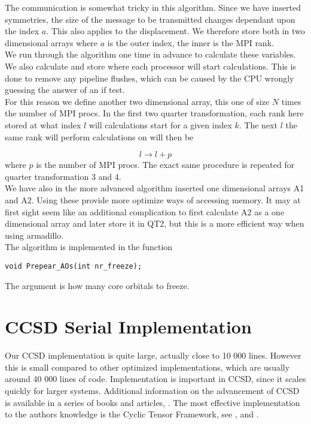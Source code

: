 \documentclass[a4paper,norsk,11pt,twoside]{report}
\begin{document}
The communication is somewhat tricky in this algorithm. Since we have
inserted symmetries, the size of the message to be transmitted changes
dependant upon the index $a$. This also applies to the
displacement. We therefore store both in two dimensional arrays where
$a$ is the outer index, the inner is the MPI rank. \\

We run through the algorithm one time in advance to calculate these
variables. We also calculate and store where each processor will start
calculations. This is done to remove any pipeline flushes, which can
be caused by the CPU wrongly guessing the answer of an if test. \\

For this reason we define another two dimensional array, this one of
size $N$ times the number of MPI procs. In the first two quarter
transformation, each rank here stored at what index $l$ will
calculations start for a given index $k$. The next $l$ the same rank
will perform calculations on will then be

\begin{equation}
l \rightarrow l + p
\end{equation}
where $p$ is the number of MPI procs. The exact same procedure is repeated for quarter transformation 3 and 4. \\

We have also in the more advanced algorithm inserted one dimensional
arrays A1 and A2. Using these provide more optimize ways of accessing
memory. It may at first sight seem like an additional complication to
first calculate A2 as a one dimensional array and later store it in
QT2, but this is a more efficient way when using armadillo. \\

The algorithm is implemented in the function 

\begin{lstlisting}
void Prepear_AOs(int nr_freeze);
\end{lstlisting}
The argument is how many core orbitals to freeze. 

\section{CCSD Serial Implementation \label{optimize_serial_version_bii}}
Our CCSD implementation is quite large, actually close to 10 000
lines. However this is small compared to other optimized
implementations, which are usually around 40 000 lines of
code. Implementation is important in CCSD, since it scales quickly for
larger systems. Additional information on the advancement of CCSD
is available in a series of books and articles,
\cite{book_om_advancements_ccsd}. The most effective implementation to
the authors knowledge is the Cyclic Tensor Framework, see
\cite{most_effective_ccsd_dude}, \cite{most_effective_ccsd_dude2} and
\cite{most_effective_ccsd_dude3}. \\
\end{document}

